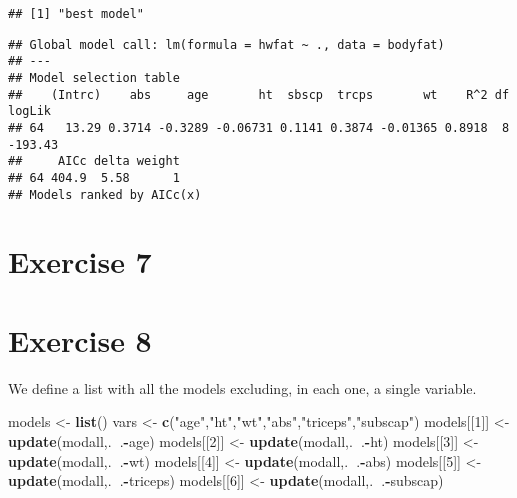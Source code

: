 \documentclass[]{article}
\newenvironment{Shaded}{\begin{snugshade}}{\end{snugshade}}
\newcommand{\DecValTok}[1]{\textcolor[rgb]{0.00,0.00,0.81}{#1}}
\newcommand{\KeywordTok}[1]{\textcolor[rgb]{0.13,0.29,0.53}{\textbf{#1}}}
\newcommand{\NormalTok}[1]{#1}
\newcommand{\OperatorTok}[1]{\textcolor[rgb]{0.81,0.36,0.00}{\textbf{#1}}}
\newcommand{\StringTok}[1]{\textcolor[rgb]{0.31,0.60,0.02}{#1}}
\begin{document}
\begin{verbatim}
## [1] "best model"
\end{verbatim}

\begin{Shaded}
\end{Shaded}

\begin{verbatim}
## Global model call: lm(formula = hwfat ~ ., data = bodyfat)
## ---
## Model selection table 
##    (Intrc)    abs     age       ht  sbscp  trcps       wt    R^2 df  logLik
## 64   13.29 0.3714 -0.3289 -0.06731 0.1141 0.3874 -0.01365 0.8918  8 -193.43
##     AICc delta weight
## 64 404.9  5.58      1
## Models ranked by AICc(x)
\end{verbatim}

\hypertarget{exercise-7}{%
\section{Exercise 7}\label{exercise-7}}

\newpage

\hypertarget{exercise-8}{%
\section{Exercise 8}\label{exercise-8}}

We define a list with all the models excluding, in each one, a single
variable.

\begin{Shaded}
\begin{Highlighting}[]
\NormalTok{models <-}\StringTok{ }\KeywordTok{list}\NormalTok{()}
\NormalTok{vars <-}\StringTok{ }\KeywordTok{c}\NormalTok{(}\StringTok{"age"}\NormalTok{,}\StringTok{"ht"}\NormalTok{,}\StringTok{"wt"}\NormalTok{,}\StringTok{"abs"}\NormalTok{,}\StringTok{"triceps"}\NormalTok{,}\StringTok{"subscap"}\NormalTok{)}
\NormalTok{models[[}\DecValTok{1}\NormalTok{]] <-}\StringTok{ }\KeywordTok{update}\NormalTok{(modall,.}\OperatorTok{~}\NormalTok{.}\OperatorTok{-}\NormalTok{age)}
\NormalTok{models[[}\DecValTok{2}\NormalTok{]] <-}\StringTok{ }\KeywordTok{update}\NormalTok{(modall,.}\OperatorTok{~}\NormalTok{.}\OperatorTok{-}\NormalTok{ht)}
\NormalTok{models[[}\DecValTok{3}\NormalTok{]] <-}\StringTok{ }\KeywordTok{update}\NormalTok{(modall,.}\OperatorTok{~}\NormalTok{.}\OperatorTok{-}\NormalTok{wt)}
\NormalTok{models[[}\DecValTok{4}\NormalTok{]] <-}\StringTok{ }\KeywordTok{update}\NormalTok{(modall,.}\OperatorTok{~}\NormalTok{.}\OperatorTok{-}\NormalTok{abs)}
\NormalTok{models[[}\DecValTok{5}\NormalTok{]] <-}\StringTok{ }\KeywordTok{update}\NormalTok{(modall,.}\OperatorTok{~}\NormalTok{.}\OperatorTok{-}\NormalTok{triceps)}
\NormalTok{models[[}\DecValTok{6}\NormalTok{]] <-}\StringTok{ }\KeywordTok{update}\NormalTok{(modall,.}\OperatorTok{~}\NormalTok{.}\OperatorTok{-}\NormalTok{subscap)}
\end{Highlighting}
\end{Shaded}
\end{document}
